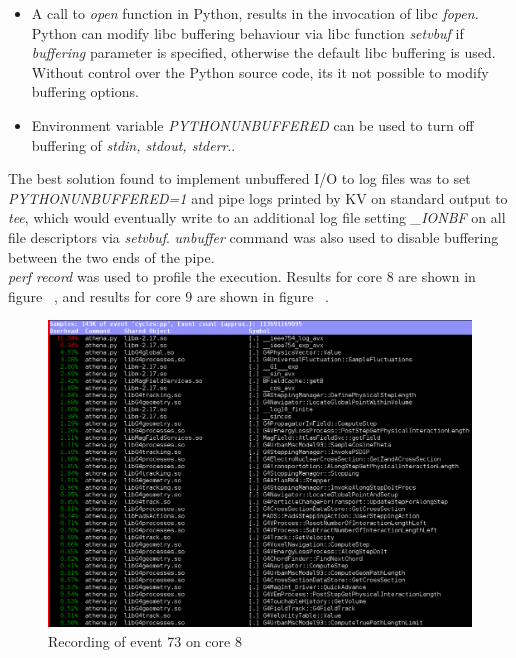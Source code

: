 \documentclass[a4paper]{jpconf}
\begin{document}

\begin{itemize}
\item A call to \textit{open} function in Python, results in the invocation
of libc \textit{fopen}. Python can modify libc buffering behaviour via libc 
function \textit{setvbuf} if \textit{buffering} parameter is specified, 
otherwise the default libc buffering is used. Without control over the Python
source code, its it not possible to modify buffering options.
\item Environment variable \textit{PYTHONUNBUFFERED} can be used to turn off
buffering of \textit{stdin, stdout, stderr}.. 
\end{itemize}
The best solution found to implement unbuffered I/O to log files was to set 
\textit{PYTHONUNBUFFERED=1} and pipe logs printed by KV on standard output to
\textit{tee}, which would eventually write to an additional log file setting 
\textit{\_IONBF} on all file descriptors via \textit{setvbuf}.
\textit{unbuffer} command was also used to disable buffering between the two
ends of the pipe. 
\\
\textit{perf record} was used to profile the execution. Results for core 8 
are shown in figure ~\cite{event-73-processor8}, and results for core 9 are 
shown in figure ~\cite{event-73-processor9}.

\begin{figure}[h]
\begin{center}
\includegraphics[scale=0.45]{images/Event73_Processor8.png}
\end{center}
\caption{\label{event-73-processor8} Recording of event 73 on core 8}
\end{figure}
\end{document}
